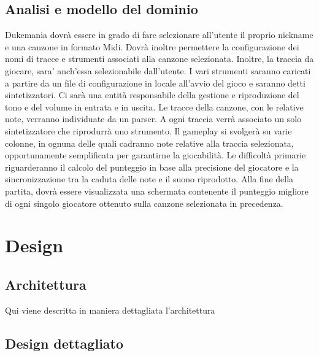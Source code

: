 \documentclass[a4paper,12pt]{report}
\begin{document}
\section{Analisi e modello del dominio}


Dukemania dovrà essere in grado di fare selezionare all'utente il proprio nickname e una canzone in formato Midi. Dovrà inoltre permettere la configurazione dei nomi di tracce e strumenti associati alla canzone selezionata. Inoltre, la traccia da giocare, sara' anch'essa selezionabile dall'utente.
I vari strumenti saranno caricati a partire da un file di configurazione in locale all'avvio del gioco e saranno detti sintetizzatori.
Ci sarà una entità responsabile della gestione e riproduzione del tono e del volume in entrata e in uscita. Le tracce della canzone, con le relative note, verranno individuate da un parser. A ogni traccia verrà associato un solo sintetizzatore che riprodurrà uno strumento.
Il gameplay si svolgerà su varie colonne, in ognuna delle quali cadranno note relative alla traccia selezionata, opportunamente semplificata per garantirne la giocabilità.
Le difficoltà primarie riguarderanno il calcolo del punteggio in base alla precisione del giocatore e la sincronizzazione tra la caduta delle note e il suono riprodotto.
Alla fine della partita, dovrà essere visualizzata una schermata contenente il punteggio migliore di ogni singolo giocatore ottenuto sulla canzone selezionata in precedenza.
\newpage



\chapter{Design}
\section{Architettura}
Qui viene descritta in maniera dettagliata l'architettura
\section{Design dettagliato}
\end{document}
